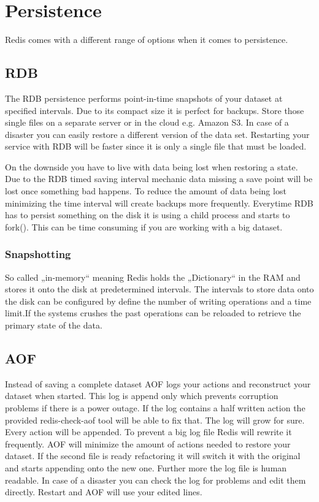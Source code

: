 \chapter{Persistence}
Redis comes with a different range of options when it comes to persistence. 

\section{RDB}
The RDB persistence performs point-in-time snapshots of your dataset at specified intervals.
Due to its compact size it is perfect for backups. Store those single files on a separate server or in the cloud e.g. Amazon S3.
In case of a disaster you can easily restore a different version of the data set.
Restarting your service with RDB will be faster since it is only a single file that must be loaded.

On the downside you have to live with data being lost when restoring a state. Due to the RDB timed saving interval mechanic data missing a save point will be lost once something bad happens.
To reduce the amount of data being lost minimizing the time interval will create backups more frequently.
Everytime RDB has to persist something on the disk it is using a child process and starts to fork(). This can be time consuming if you are working with a big dataset.

\subsection{Snapshotting}
So called „in-memory“ meaning Redis holds the „Dictionary“ in the RAM and stores it onto the disk at predetermined intervals. The intervals to store data onto the disk can be configured by define the number of writing operations and a time limit.If the systems crushes the past operations can be reloaded to retrieve the primary state of the data.

\section{AOF}
Instead of saving a complete dataset AOF logs your actions and reconstruct your dataset when started.
This log is append only which prevents corruption problems if there is a power outage. If the log contains a half written action the provided redis-check-aof tool will be able to fix that.
The log will grow for sure. Every action will be appended. To prevent a big log file Redis will rewrite it frequently. AOF will minimize the amount of actions needed to restore your dataset. If the second file is ready refactoring it will switch it with the original and starts appending onto the new one.
Further more the log file is human readable. In case of a disaster you can check the log for problems and edit them directly. Restart and AOF will use your edited lines.

